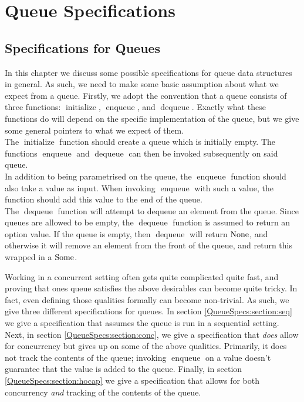 \documentclass[a4paper, 10pt]{report}
\theoremstyle{definition}
\newcommand{\initialise}{\operatorname{initialize}}
\newcommand{\enqueue}{\operatorname{enqueue}}
\newcommand{\dequeue}{\operatorname{dequeue}}
\begin{document}

\chapter{Queue Specifications}
\label{ch:QueueSpecs}

\section{Specifications for Queues}
\label{QueueSpecs:section:specs}

In this chapter we discuss some possible specifications for queue data structures in general. As such, we need to make some basic assumption about what we expect from a queue. Firstly, we adopt the convention that a queue consists of three functions: $\initialise$, $\enqueue$, and $\dequeue$. Exactly what these functions do will depend on the specific implementation of the queue, but we give some general pointers to what we expect of them.\\
The $\initialise$ function should create a queue which is initially empty. The functions $\enqueue$ and $\dequeue$ can then be invoked subsequently on said queue.\\
In addition to being parametrised on the queue, the $\enqueue$ function should also take a value as input. When invoking $\enqueue$ with such a value, the function should add this value to the end of the queue.\\
The $\dequeue$ function will attempt to dequeue an element from the queue. Since queues are allowed to be empty, the $\dequeue$ function is assumed to return an option value. If the queue is empty, then $\dequeue$ will return $\operatorname{None}$, and otherwise it will remove an element from the front of the queue, and return this wrapped in a $\operatorname{Some}$.

Working in a concurrent setting often gets quite complicated quite fast, and proving that ones queue satisfies the above desirables can become quite tricky. In fact, even defining those qualities formally can become non-trivial. As such, we give three different specifications for queues. In section \ref{QueueSpecs:section:seq} we give a specification that assumes the queue is run in a sequential setting. Next, in section \ref{QueueSpecs:section:conc}, we give a specification that \textit{does} allow for concurrency but gives up on some of the above qualities. Primarily, it does not track the contents of the queue; invoking $\enqueue$ on a value doesn't guarantee that the value is added to the queue. Finally, in section \ref{QueueSpecs:section:hocap} we give a specification that allows for both concurrency \textit{and} tracking of the contents of the queue.
\end{document}
